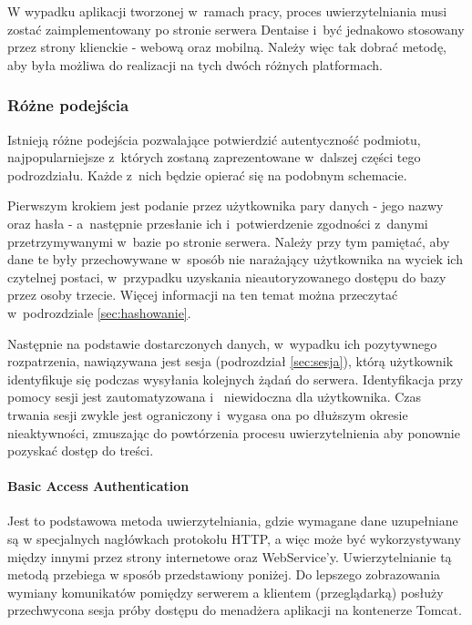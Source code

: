 \documentclass[11pt]{aghdpl}
\begin{document}
W wypadku aplikacji tworzonej w~ramach pracy, proces uwierzytelniania musi zostać zaimplementowany po stronie serwera Dentaise i~być jednakowo stosowany przez strony klienckie - webową oraz mobilną. Należy więc tak dobrać metodę, aby była możliwa do realizacji na tych dwóch różnych platformach.

\subsubsection{Różne podejścia}

Istnieją różne podejścia pozwalające potwierdzić autentyczność podmiotu, najpopularniejsze z~których zostaną zaprezentowane w~dalszej części tego podrozdziału. Każde z~nich będzie opierać się na podobnym schemacie. 

Pierwszym krokiem jest podanie przez użytkownika pary danych - jego nazwy oraz hasła - a~następnie przesłanie ich i~potwierdzenie zgodności z~danymi przetrzymywanymi w~bazie po stronie serwera. Należy przy tym pamiętać, aby dane te były przechowywane w~sposób nie narażający użytkownika na wyciek ich czytelnej postaci, w~przypadku uzyskania nieautoryzowanego dostępu do bazy przez osoby trzecie. Więcej informacji na ten temat można przeczytać w~podrozdziale \ref{sec:hashowanie}. 

Następnie na podstawie dostarczonych danych, w~wypadku ich pozytywnego rozpatrzenia, nawiązywana jest sesja (podrozdział \ref{sec:sesja}), którą użytkownik identyfikuje się  podczas wysyłania kolejnych żądań do serwera. Identyfikacja przy pomocy sesji jest zautomatyzowana i~ niewidoczna dla użytkownika. Czas trwania sesji zwykle jest ograniczony i~wygasa ona po dłuższym okresie nieaktywności, zmuszając do powtórzenia procesu uwierzytelnienia aby ponownie pozyskać dostęp do treści.

\paragraph{Basic Access Authentication}

Jest to podstawowa metoda uwierzytelniania, gdzie wymagane dane uzupełniane są w specjalnych nagłówkach protokołu HTTP, a więc może być wykorzystywany między innymi przez strony internetowe oraz WebService'y. Uwierzytelnianie tą metodą  przebiega w sposób przedstawiony poniżej. Do lepszego zobrazowania wymiany komunikatów pomiędzy serwerem a klientem (przeglądarką) posłuży przechwycona sesja próby dostępu do menadżera aplikacji na kontenerze Tomcat.
\end{document}
